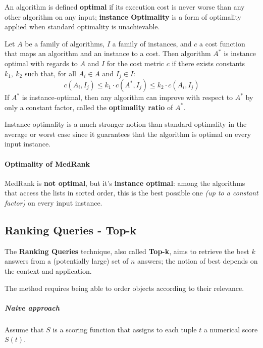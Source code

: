 \documentclass[english]{article}
\begin{document}
An algorithm is defined \textbf{optimal} if its execution cost is never worse than any other algorithm on any input;
\textbf{instance Optimality} is a form of optimality applied when standard optimality is unachievable.

Let \(A\) be a family of algorithms, \(I\) a family of instances, and \(c\) a cost function that maps an algorithm and an instance to a cost.
Then algorithm \(A^\ast\) is instance optimal with regards to \(A\) and \(I\) for the cost metric \(c\) if there exists constants \(k_1, \ k_2\) such that, for all \(A_i \in A\) and \(I_j \in I\):
\[ c\left( A_i, I_j \right) \leq k_1 \cdot c\left( A^\ast, I_j \right) \leq k_2 \cdot c\left( A_i, I_j \right) \]
If \(A^\ast\) is instance-optimal, then any algorithm can improve with respect to \(A^\ast\) by only a constant factor, called the \textbf{optimality ratio} of \(A^\ast\).

Instance optimality is a much stronger notion than standard optimality in the average or worst case since it guarantees that the algorithm is optimal on every input instance.

\paragraph{Optimality of MedRank}


MedRank is \textbf{not optimal}, but it's \textbf{instance optimal}:
among the algorithms that access the lists in sorted order, this is the best possible one \textit{(up to a constant factor)} on every input instance.

\subsection{Ranking Queries - Top-k}

The \textbf{Ranking Queries} technique, also called \textbf{Top-k}, aims to retrieve the best \(k\) answers from a (potentially large) set of \(n\) answers;
the notion of best depends on the context and application.

The method requires being able to order objects according to their relevance.

\subparagraph*{Naive approach}
Assume that \(S\) is a scoring function that assigns to each tuple \(t\) a numerical score \(S(t)\).
\end{document}
